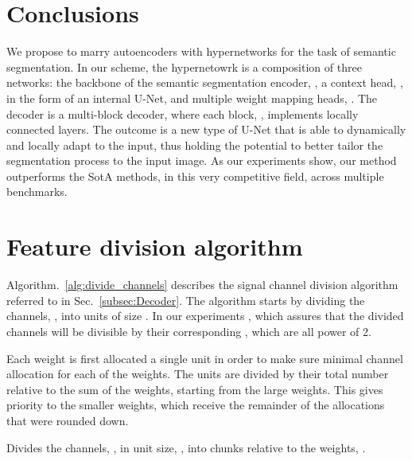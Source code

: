 \documentclass[final]{cvpr}
\begin{document}
\section{Conclusions}
We propose to marry autoencoders with hypernetworks for the task of semantic segmentation. In our scheme, the hypernetowrk is a composition of three networks: the backbone of the semantic segmentation encoder, , a context head, , in the form of an internal U-Net, and multiple weight mapping heads, . The decoder is a multi-block decoder, where each block, , implements locally connected layers. The outcome is a new type of U-Net that is able to dynamically and locally adapt to the input, thus holding the potential to better tailor the segmentation process to the input image. As our experiments show, our method outperforms the SotA methods, in this very competitive field, across multiple benchmarks. 



{\small


}

\appendix


\section{Feature division algorithm}
\label{sec:Feature division algorithm}
Algorithm.~\ref{alg:divide_channels} describes the signal channel division algorithm referred to in Sec.~\ref{subsec:Decoder}. The algorithm starts by dividing the channels, , into units of size . In our experiments , which assures that the divided channels will be divisible by their corresponding , which are all power of 2.

Each weight is first allocated a single unit in order to make sure minimal channel allocation for each of the weights. The units are divided by their total number relative to the sum of the weights, starting from the large weights. This gives priority to the smaller weights, which receive the remainder of the allocations that were rounded down.

\begin{algorithm*}[!t]
\caption{Divides the channels, , in unit size, , into chunks relative to the weights, .}
\label{alg:divide_channels}
\begin{algorithmic}[1]

    \State 
    \State    {}
    \State   {}
    \State  {}
    \State 
    \State 
    \While{}
         \If{}
            \State 
        \Else
        \State 
        \EndIf
        \State 
        \State 
        \State  
    \EndWhile
    \State
    \Return 
\EndProcedure

\end{algorithmic}
\end{algorithm*}
\end{document}
